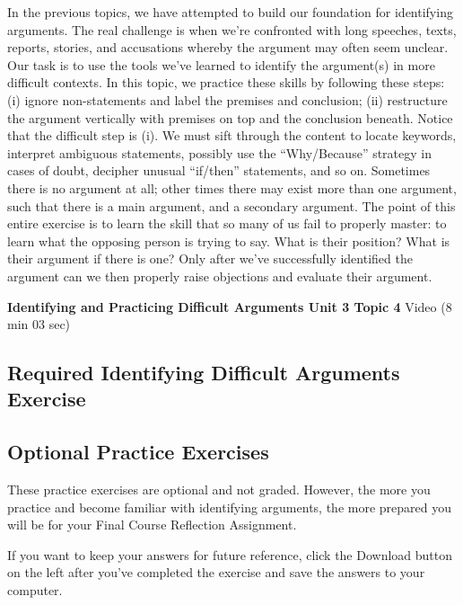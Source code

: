 \documentclass[
]{book}
\begin{document}
In the previous topics, we have attempted to build our foundation for identifying arguments. The real challenge is when we're confronted with long speeches, texts, reports, stories, and accusations whereby the argument may often seem unclear. Our task is to use the tools we've learned to identify the argument(s) in more difficult contexts. In this topic, we practice these skills by following these steps: (i) ignore non-statements and label the premises and conclusion; (ii) restructure the argument vertically with premises on top and the conclusion beneath. Notice that the difficult step is (i). We must sift through the content to locate keywords, interpret ambiguous statements, possibly use the ``Why/Because'' strategy in cases of doubt, decipher unusual ``if/then'' statements, and so on. Sometimes there is no argument at all; other times there may exist more than one argument, such that there is a main argument, and a secondary argument. The point of this entire exercise is to learn the skill that so many of us fail to properly master: to learn what the opposing person is trying to say. What is their position? What is their argument if there is one? Only after we've successfully identified the argument can we then properly raise objections and evaluate their argument.

\textbf{Identifying and Practicing Difficult Arguments Unit 3 Topic 4} Video (8 min 03 sec)

\hypertarget{required-identifying-difficult-arguments-exercise}{%
\subsection*{Required Identifying Difficult Arguments Exercise}\label{required-identifying-difficult-arguments-exercise}}

\begin{reflect}
\end{reflect}

\hypertarget{optional-practice-exercises}{%
\subsection*{Optional Practice Exercises}\label{optional-practice-exercises}}

\begin{reflect}
These practice exercises are optional and not graded. However, the more you practice and become familiar with identifying arguments, the more prepared you will be for your Final Course Reflection Assignment.

If you want to keep your answers for future reference, click the Download button on the left after you've completed the exercise and save the answers to your computer.
\end{reflect}
\end{document}
